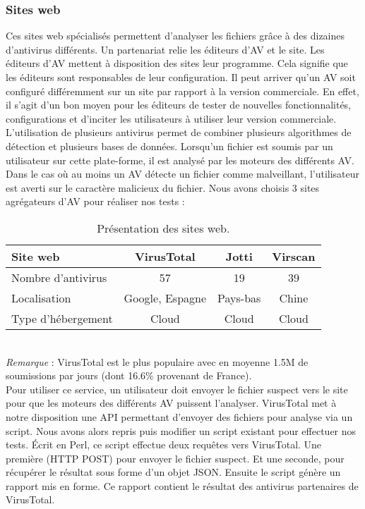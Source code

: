 \documentclass[smallextended]{svjour3}       %
\begin{document}
\subsubsection{Sites web}
\label{2.2.1sites}
Ces sites web spécialisés permettent d'analyser les fichiers grâce à des dizaines d'antivirus différents. Un partenariat relie les éditeurs d'AV et le site. Les éditeurs d'AV mettent à disposition des sites leur programme. Cela signifie que les éditeurs sont responsables de leur configuration. Il peut arriver qu'un AV soit configuré différemment sur un site par rapport à la version commerciale. En effet, il s'agit d'un bon moyen pour les éditeurs de tester de nouvelles fonctionnalités, configurations et d'inciter les utilisateurs à utiliser leur version commerciale. L'utilisation de plusieurs antivirus permet de combiner plusieurs algorithmes de détection et plusieurs bases de données. Lorsqu'un fichier est soumis par un utilisateur sur cette plate-forme, il est analysé par les moteurs des différents AV. Dans le cas où au moins un AV détecte un fichier comme malveillant, l'utilisateur est averti sur le caractère malicieux du fichier. Nous avons choisis 3 sites agrégateurs d'AV pour réaliser nos tests :
\begin{table}[ht!]
	\begin{center}
		\begin{normalsize}
			\begin{tabular}{|l|c|c|c|}
  			\hline
   			\textbf{Site web} & \textbf{VirusTotal} & \textbf{Jotti} & \textbf{Virscan} \\
   			\hline
  			Nombre d'antivirus & 57 & 19 & 39\\
  			\hline
  			Localisation & Google, Espagne & Pays-bas & Chine\\
  			\hline
  			Type d’hébergement & Cloud & Cloud & Cloud\\
  			\hline
			\end{tabular}
		\end{normalsize}
	\end{center}
	\caption{Présentation des sites web.}
\end{table}
\\
\textit{Remarque} : VirusTotal est le plus populaire avec en moyenne 1.5M de soumissions par jours (dont 16.6\% provenant de France).\\
$ $\\
Pour utiliser ce service, un utilisateur doit envoyer le fichier suspect vers le site pour que les moteurs des différents AV puissent l'analyser. VirusTotal met à notre disposition une API permettant d'envoyer des fichiers pour analyse via un script. Nous avons alors repris puis modifier un script \cite{API} existant pour effectuer nos tests. Écrit en Perl, ce script effectue deux requêtes vers VirusTotal. Une première (HTTP POST) pour envoyer le fichier suspect. Et une seconde, pour récupérer le résultat sous forme d'un objet JSON. Ensuite le script génère un rapport mis en forme. Ce rapport contient le résultat des antivirus partenaires de VirusTotal.\\
\end{document}
